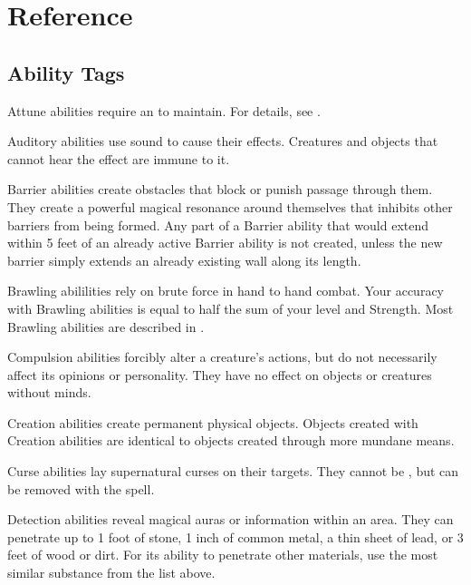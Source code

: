 \chapter{Reference}\label{Reference}

\section{Ability Tags}\label{Ability Tags}

   Attune abilities require an  to maintain.
  For details, see .

   Auditory abilities use sound to cause their effects.
  Creatures and objects that cannot hear the effect are immune to it.

   Barrier abilities create obstacles that block or punish passage through them.
  They create a powerful magical resonance around themselves that inhibits other barriers from being formed.
  Any part of a Barrier ability that would extend within 5 feet of an already active Barrier ability is not created, unless the new barrier simply extends an already existing wall along its length.

   Brawling abililities rely on brute force in hand to hand combat.
  Your accuracy with Brawling abilities is equal to half the sum of your level and Strength.
  Most Brawling abilities are described in .

   Compulsion abilities forcibly alter a creature's actions, but do not necessarily affect its opinions or personality.
  They have no effect on objects or creatures without minds.

   Creation abilities create permanent physical objects.
  Objects created with Creation abilities are identical to objects created through more mundane means.

   Curse abilities lay supernatural curses on their targets.
  They cannot be , but can be removed with the  spell.

  \label{Detection} Detection abilities reveal magical auras or information within an area.
  They can penetrate up to 1 foot of stone, 1 inch of common metal, a thin sheet of lead, or 3 feet of wood or dirt.
  For its ability to penetrate other materials, use the most similar substance from the list above.

